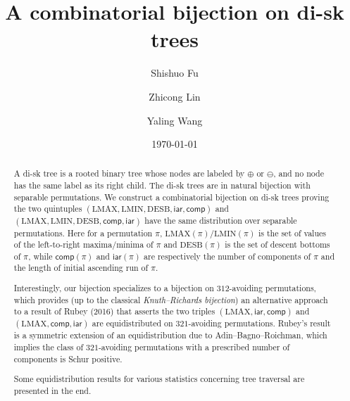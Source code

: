 \documentclass[12pt]{amsart}
\numberwithin{equation}{section}
\theoremstyle{plain}
\theoremstyle{definition}
\def\iar{\mathsf{iar}}
\def\comp{\mathsf{comp}}
\def\LMAX{\mathrm{LMAX}}
\def\LMIN{\mathrm{LMIN}}
\def\LMIN{\mathrm{LMIN}}
\def\DESB{\mathrm{DESB}}
\def\DESB{\mathrm{DESB}}
\begin{document}
\title[A combinatorial bijection on di-sk trees]{A combinatorial bijection on di-sk trees}


\author[S. Fu]{Shishuo Fu}
\address[Shishuo Fu]{College of Mathematics and Statistics, Chongqing University, Huxi campus, Chongqing 401331, P.R. China}

\author[Z. Lin]{Zhicong Lin}
\address[Zhicong Lin]{Research Center for Mathematics and Interdisciplinary Sciences, Shandong University, Qingdao 266237, P.R. China}

\author[Y. Wang]{Yaling Wang}
\address[Yaling Wang]{School of Mathematical Sciences, Dalian University of Technology, Dalian 116024, P.R. China}

\date{\today}


\begin{abstract}
A di-sk tree is a rooted binary tree whose nodes are labeled by $\oplus$ or $\ominus$, and no node has the same label as its right child. The di-sk trees are in natural bijection with separable permutations. We construct a combinatorial bijection on di-sk trees proving  the two quintuples $(\LMAX,\LMIN,\DESB,\iar,\comp)$ and $(\LMAX,\LMIN,\DESB,\comp,\iar)$ have the same distribution over separable permutations. Here for a permutation $\pi$, $\LMAX(\pi)/\LMIN(\pi)$ is the set of values of the left-to-right maxima/minima of $\pi$ and $\DESB(\pi)$ is the set of descent bottoms of $\pi$, while $\comp(\pi)$ and $\iar(\pi)$ are respectively  the number of components of $\pi$ and the length of initial ascending run of $\pi$. 

Interestingly, our bijection specializes to a bijection on $312$-avoiding permutations, which provides  (up to the classical {\em Knuth--Richards bijection}) an alternative approach to a result of Rubey (2016) that asserts the  two triples $(\LMAX,\iar,\comp)$ and $(\LMAX,\comp,\iar)$ are equidistributed  on $321$-avoiding permutations. Rubey's result is a symmetric extension of an equidistribution due to Adin--Bagno--Roichman, which implies the class of $321$-avoiding permutations with a prescribed number of components is Schur positive. 

Some equidistribution results for various statistics concerning tree traversal are presented in the end.
















\end{abstract}
\end{document}
